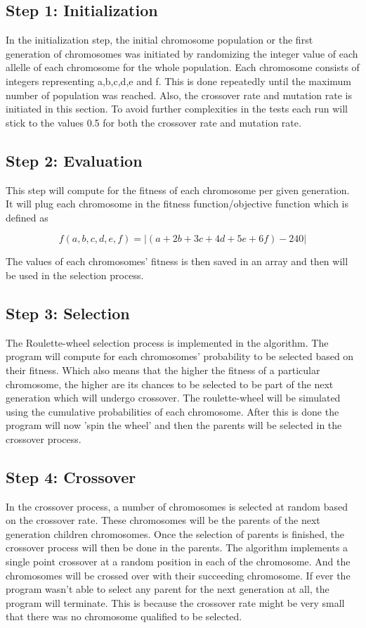 \documentclass{acm_proc_article-sp}
\begin{document}
\subsection{Step 1: Initialization}
In the initialization step, the initial chromosome population or the first generation of chromosomes was initiated by randomizing the integer value of each allelle of each chromosome for the whole population. Each chromosome consists of integers representing a,b,c,d,e and f. This is done repeatedly until the maximum number of population was reached. Also, the crossover rate and mutation rate is initiated in this section. To avoid further complexities in the tests each run will stick to the values 0.5 for both the crossover rate and mutation rate.

\subsection{Step 2: Evaluation}
This step will compute for the fitness of each chromosome per given generation. It will plug each chromosome in the fitness function/objective function which is defined as 

\begin{equation}
f(a,b,c,d,e,f) = |(a + 2b + 3c + 4d + 5e + 6f) -240|
\end{equation}

The values of each chromosomes' fitness is then saved in an array and then will be used in the selection process.

\subsection{Step 3: Selection}
The Roulette-wheel selection process is implemented in the algorithm. The program will compute for each chromosomes' probability to be selected based on their fitness. Which also means that the higher the fitness of a particular chromosome, the higher are its chances to be selected to be part of the next generation which will undergo crossover. The roulette-wheel will be simulated using the cumulative probabilities of each chromosome. After this is done the program will now 'spin the wheel' and then the parents will be selected in the crossover process.

\subsection{Step 4: Crossover}
In the crossover process, a number of chromosomes is selected at random based on the crossover rate. These chromosomes will be the parents of the next generation children chromosomes. Once the selection of parents is finished, the crossover process will then be done in the parents. The algorithm implements a single point crossover at a random position in each of the chromosome. And the chromosomes will be crossed over with their succeeding chromosome. If ever the program wasn't able to select any parent for the next generation at all, the program will terminate. This is because the crossover rate might be very small that there was no chromosome qualified to be selected.
\end{document}
